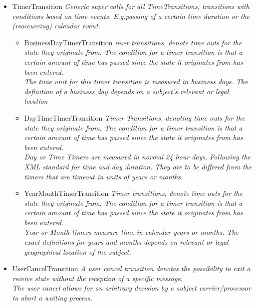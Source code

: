\begin{itemize}
\begin{itemize}
\begin{itemize}
\begin{itemize}
\begin{itemize}
\begin{itemize}
				\end{itemize}
				\item TimerTransition \linebreak \textit{Generic super calls for all TimeTransitions, transitions with conditions based on time events. E.g.passing of a certain time duration or the (reoccurring) calendar event. }
				\begin{itemize}
					\item BusinessDayTimerTransition \linebreak \textit{imer transitions, denote time outs for the state they originate from. The condition for a timer transition is that a certain amount of time has passed since the state it originates from has been entered.\\ The time unit for this timer transition is measured in business days. The definition of a business day depends on a subject's relevant or legal location}
					\item DayTimeTimerTransition \linebreak \textit{Timer Transitions, denoting time outs for the state they originate from. The condition for a timer transition is that a certain amount of time has passed since the state it originates from has been entered.\\ Day or Time Timers are measured in normal 24 hour days. Following the XML standard for time and day duration. They are to be differed from the timers that are timeout in units of years or months.}
					\item YearMonthTimerTransition \linebreak \textit{Timer transitions, denote time outs for the state they originate from. The condition for a timer transition is that a certain amount of time has passed since the state it originates from has been entered.\\ Year or Month timers measure time in calendar years or months. The exact definitions for years and months depends on relevant or legal geographical location of the subject.}
				\end{itemize}
				\item UserCancelTransition \linebreak \textit{A user cancel transition denotes the possibility to exit a receive state without the reception of a specific message.\\ The user cancel allows for an arbitrary decision by a subject carrier/processor to abort a waiting process.}
			\end{itemize}

\end{itemize}
\end{itemize}
\end{itemize}
\end{itemize}
